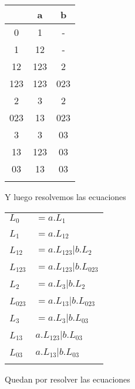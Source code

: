 \begin{tabular}{c | c | c}
	& a 	& b 	\\
\hline
0 	& 1 	& - 	\\
1 	& 12 	& - 	\\
12 	& 123 	& 2 	\\
123 & 123 	& 023 	\\
2 	& 3 	& 2 	\\
023 & 13 	& 023 	\\
3 	& 3 	& 03 	\\
13 	& 123 	& 03 	\\
03 	& 13 	& 03 	\\ \\
\end{tabular}

Y luego resolvemos las ecuaciones \\

\begin{tabular}{l l}
$L_0$ & $= a.L_1$ \\ \\

$L_1$ & $= a.L_{12}$ \\ \\

$L_{12}$ & $= a.L_{123} | b.L_2$ \\ \\

$L_{123}$ & $= a.L_{123} | b.L_{023}$ \\ \\

$L_2$ & $= a.L_3 | b.L_2$ \\ \\

$L_{023}$ & $= a.L_{13} | b.L_{023}$ \\ \\

$L_3$ & $= a.L_3 | b.L_{03}$ \\ \\

$L_{13}$ & $a.L_{123} | b.L_{03}$ \\ \\

$L_{03}$ & $a.L_{13} | b.L_{03}$ \\ \\
\end{tabular}

Quedan por resolver las ecuaciones

\setcounter{subsection}{5}
\subsection{}
